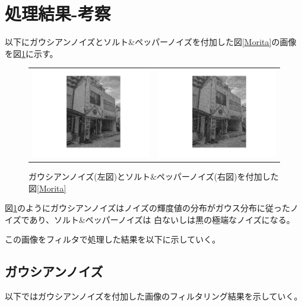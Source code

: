 \documentclass[a4paper,11pt,dvipdfmx]{jsarticle}
\begin{document}
\section{処理結果-考察}
以下にガウシアンノイズとソルト\&ペッパーノイズを付加した図\ref{Morita}の画像を図\ref{noise}に示す。
\begin{figure}[h]
    \centering
    \begin{tabular}{cc}
        \begin{minipage}[c]{0.45\hsize}
            \centering
            \includegraphics[width=70mm]{./img/gauss_before.jpg}
        \end{minipage}&
        \begin{minipage}[c]{0.45\hsize}
            \centering
            \includegraphics[width=70mm]{./img/sp_before.jpg}
        \end{minipage}
    \end{tabular}
    \caption{ガウシアンノイズ(左図)とソルト\&ペッパーノイズ(右図)を付加した図\ref{Morita}}
    \label{noise}
\end{figure}

図\ref{noise}のようにガウシアンノイズはノイズの輝度値の分布がガウス分布に従ったノイズであり、ソルト\&ペッパーノイズは
白ないしは黒の極端なノイズになる。

この画像をフィルタで処理した結果を以下に示していく。

\subsection{ガウシアンノイズ}
以下ではガウシアンノイズを付加した画像のフィルタリング結果を示していく。
\end{document}
